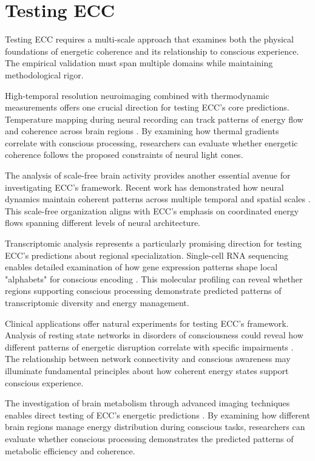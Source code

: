 \section{Testing ECC}

Testing ECC requires a multi-scale approach that examines both the physical foundations of energetic coherence and its relationship to conscious experience. The empirical validation must span multiple domains while maintaining methodological rigor.

High-temporal resolution neuroimaging combined with thermodynamic measurements offers one crucial direction for testing ECC's core predictions. Temperature mapping during neural recording can track patterns of energy flow and coherence across brain regions \cite{Watts2018}. By examining how thermal gradients correlate with conscious processing, researchers can evaluate whether energetic coherence follows the proposed constraints of neural light cones.

The analysis of scale-free brain activity provides another essential avenue for investigating ECC's framework. Recent work has demonstrated how neural dynamics maintain coherent patterns across multiple temporal and spatial scales \cite{He2014}. This scale-free organization aligns with ECC's emphasis on coordinated energy flows spanning different levels of neural architecture.

Transcriptomic analysis represents a particularly promising direction for testing ECC's predictions about regional specialization. Single-cell RNA sequencing enables detailed examination of how gene expression patterns shape local "alphabets" for conscious encoding \cite{Gallegos2020}. This molecular profiling can reveal whether regions supporting conscious processing demonstrate predicted patterns of transcriptomic diversity and energy management.

Clinical applications offer natural experiments for testing ECC's framework. Analysis of resting state networks in disorders of consciousness could reveal how different patterns of energetic disruption correlate with specific impairments \cite{Fox2010}. The relationship between network connectivity and conscious awareness may illuminate fundamental principles about how coherent energy states support conscious experience.

The investigation of brain metabolism through advanced imaging techniques enables direct testing of ECC's energetic predictions \cite{Magistretti2018}. By examining how different brain regions manage energy distribution during conscious tasks, researchers can evaluate whether conscious processing demonstrates the predicted patterns of metabolic efficiency and coherence.

